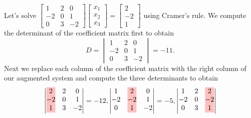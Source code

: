 \begin{example}
Let's solve $
\begin {bmatrix} 1&2&0\\-2&0&1\\0&3&-2\end {bmatrix} 
\begin {bmatrix} x_1\\x_2\\x_3\end {bmatrix} 
=  \begin{bmatrix} 2\\-2\\1\end {bmatrix}
$ using Cramer's rule.  
We compute the determinant of the coefficient matrix first to obtain
$$D=\begin{vmatrix} 1&2&0\\-2&0&1\\0&3&-2\end {vmatrix} = -11.$$ Next we replace each column of the coefficient matrix with the right column of our augmented system and compute the three determinants to obtain
$$
\begin{vmatrix} 
\tikz \draw node[fill=pink,inner sep=0cm]{$\cl{2\\-2\\1}$};
& \tikz \draw node[inner sep=0cm]{$\cl{2\\0\\3}$};
&\tikz\draw node[inner sep=0cm]{$\cl{0\\1\\-2}$};
\end {vmatrix}  
 =-12,
\begin{vmatrix} 
\tikz \draw node[inner sep=0cm]{$\cl{1\\-2\\0}$};
& \tikz \draw node[fill=pink,inner sep=0cm]{$\cl{2\\-2\\1}$};
&\tikz\draw node[inner sep=0cm]{$\cl{0\\1\\-2}$};
\end {vmatrix}  
=-5, 
\begin{vmatrix} 
\tikz \draw node[inner sep=0cm]{$\cl{1\\-2\\0}$};
& \tikz \draw node[inner sep=0cm]{$\cl{2\\0\\3}$};
&\tikz \draw node[fill=pink,inner sep=0cm]{$\cl{2\\-2\\1}$};

\end{vmatrix}$$
\end{example}
